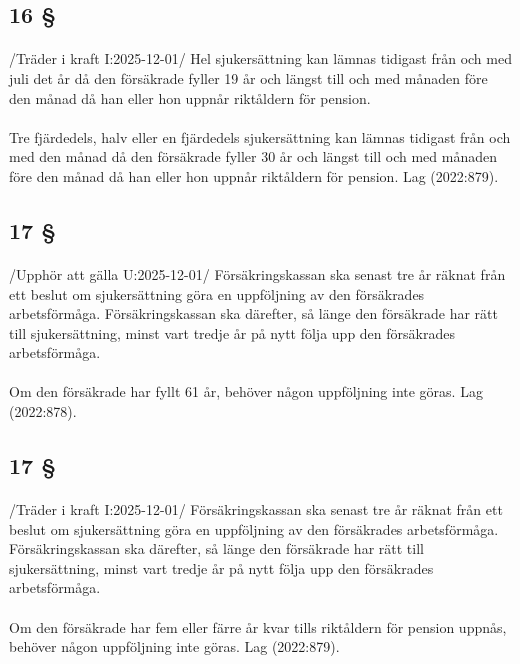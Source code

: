 \documentclass[a4paper,notitlepage,openany,10pt]{book}
\begin{document}
\subsection*{16 §}
\paragraph*{}
/Träder i kraft I:2025-12-01/
Hel sjukersättning kan lämnas tidigast från och med juli det år då den försäkrade fyller 19 år och längst till och med månaden före den månad då han eller hon uppnår riktåldern för pension.
\paragraph*{}
Tre fjärdedels, halv eller en fjärdedels sjukersättning kan lämnas tidigast från och med den månad då den försäkrade fyller 30 år och längst till och med månaden före den månad då han eller hon uppnår riktåldern för pension.
Lag (2022:879).
\subsection*{17 §}
\paragraph*{}
/Upphör att gälla U:2025-12-01/
Försäkringskassan ska senast tre år räknat från ett beslut om sjukersättning göra en uppföljning av den försäkrades arbetsförmåga. Försäkringskassan ska därefter, så länge den försäkrade har rätt till sjukersättning, minst vart tredje år på nytt följa upp den försäkrades arbetsförmåga.
\paragraph*{}
Om den försäkrade har fyllt 61 år, behöver någon uppföljning inte göras.
Lag (2022:878).
\subsection*{17 §}
\paragraph*{}
/Träder i kraft I:2025-12-01/
Försäkringskassan ska senast tre år räknat från ett beslut om sjukersättning göra en uppföljning av den försäkrades arbetsförmåga. Försäkringskassan ska därefter, så länge den försäkrade har rätt till sjukersättning, minst vart tredje år på nytt följa upp den försäkrades arbetsförmåga.
\paragraph*{}
Om den försäkrade har fem eller färre år kvar tills riktåldern för pension uppnås, behöver någon uppföljning inte göras.
Lag (2022:879).
\end{document}
